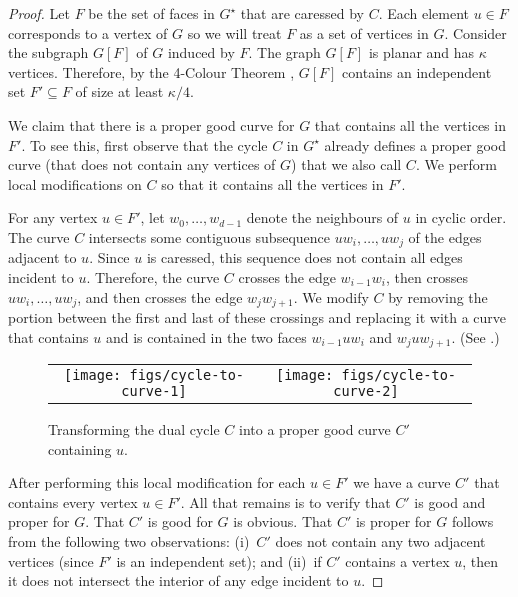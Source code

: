\documentclass{patmorin}
\newcommand{\dual}[1]{{#1}^\star}
\begin{document}
\begin{proof}
  Let $F$ be the set of faces in $\dual{G}$ that are caressed by $C$. Each
  element $u\in F$ corresponds to a vertex of $G$ so we will treat $F$ as
  a set of vertices in $G$.  Consider the subgraph $G[F]$ of $G$ induced
  by $F$.  The graph $G[F]$ is planar and has $\kappa$ vertices. Therefore,
  by the 4-Colour Theorem \cite{robertson.seymour.ea:four-colour}, $G[F]$
  contains an independent set $F'\subseteq F$ of size at least $\kappa/4$.

  We claim that there is a proper good curve for $G$ that contains all
  the vertices in $F'$.  To see this, first observe that the cycle $C$ in
  $\dual{G}$ already defines a proper good curve (that does not contain
  any vertices of $G$) that we also call $C$.  We perform
  local modifications on $C$ so that it contains all the vertices in $F'$.

  For any vertex $u\in F'$, let $w_0,\ldots,w_{d-1}$ denote the neighbours
  of $u$ in cyclic order.  The curve $C$ intersects some contiguous
  subsequence $uw_i,\ldots,uw_j$ of the edges adjacent to $u$.  Since $u$
  is caressed, this sequence does not contain all edges incident
  to $u$. Therefore, the curve $C$ crosses the edge $w_{i-1}w_i$, then
  crosses $uw_i,\ldots,uw_j$, and then crosses the edge $w_j w_{j+1}$.
  We modify $C$ by removing the portion between the first and last of
  these crossings and replacing it with a curve that contains $u$ and is
  contained in the two faces $w_{i-1}uw_i$ and $w_juw_{j+1}$. (See
  .)

  \begin{figure}
     \begin{center}
	\begin{tabular}{cc}
		\texttt{[image: figs/cycle-to-curve-1]} &
		\texttt{[image: figs/cycle-to-curve-2]}
	\end{tabular}
     \end{center}
     \caption{Transforming the dual cycle $C$ into a proper good curve $C'$ containing $u$.}
  \end{figure}

  After performing this local modification for each $u\in F'$ we have
  a curve $C'$ that contains every vertex $u\in F'$.  All that remains
  is to verify that $C'$ is good and proper for $G$. That $C'$ is good for
  $G$ is obvious.  That $C'$ is proper for $G$ follows from the following two
  observations: (i)~$C'$ does not contain any two adjacent vertices (since
  $F'$ is an independent set); and (ii)~if $C'$ contains a vertex $u$,
  then it does not intersect the interior of any edge incident to $u$.
\end{proof}
\end{document}

